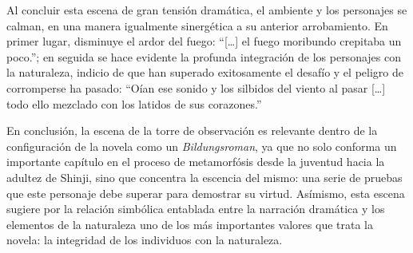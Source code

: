 Al concluir esta escena de gran tensión dramática, el ambiente y los personajes se calman, en una manera igualmente sinergética a su anterior arrobamiento. En primer lugar, disminuye el ardor del fuego: ``[\ldots] el fuego moribundo crepitaba un poco.''\autocite{mishima2006}; en seguida se hace evidente la profunda integración de los personajes con la naturaleza, indicio de que han superado exitosamente el desafío y el peligro de corromperse ha pasado: ``Oían ese sonido y los silbidos del viento al pasar [\ldots] todo ello mezclado con los latidos de sus corazones.''\autocite{mishima2006}

En conclusión, la escena de la torre de observación es relevante dentro de la configuración de la novela como un \emph{Bildungsroman}, ya que no solo conforma un importante capítulo en el proceso de metamorfósis desde la juventud hacia la adultez de Shinji, sino que concentra la escencia del mismo: una serie de pruebas que este personaje debe superar para demostrar su virtud. Asímismo, esta escena sugiere por la relación simbólica entablada  entre la narración dramática y los elementos de la naturaleza uno de los más importantes valores que trata la novela: la integridad de los individuos con la naturaleza. 
